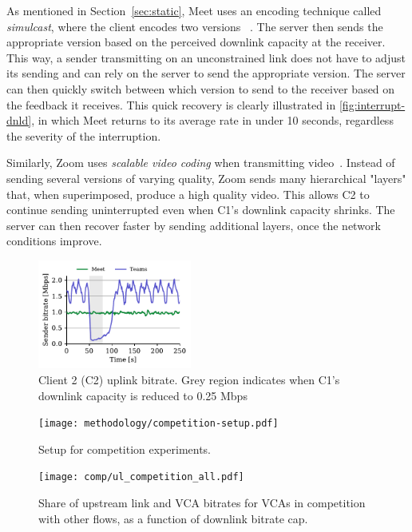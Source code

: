 As mentioned in Section~\ref{sec:static}, Meet uses an encoding technique called \textit{simulcast}, where the client encodes two versions ~\cite{nistico2020comparative}. The server then sends the appropriate version based on the perceived downlink capacity at the receiver. This way, a sender transmitting on an unconstrained link does not have to adjust its sending and can rely on the server to send the appropriate version. The server can then quickly switch between which version to send to the receiver based on the feedback it receives. This quick recovery is clearly illustrated in \ref{fig:interrupt-dnld}, in which Meet returns to its average rate in under 10 seconds, regardless the severity of the interruption.

Similarly, Zoom uses \textit{scalable video coding} when transmitting video~\cite{zoom_encoding}. Instead of sending several versions of varying quality, Zoom sends many hierarchical "layers" that, when superimposed, produce a high quality video. This allows C2 to continue sending uninterrupted even when C1's downlink capacity shrinks. The server can then recover faster by sending additional layers, once the network conditions improve.  


\begin{figure}[t]
    \centering
    \includegraphics[width=0.45\textwidth,keepaspectratio]{../figures/interrupt/Interrupt-sender.pdf}
    \caption{Client 2 (C2) uplink bitrate. Grey region indicates when C1's downlink capacity is reduced to 0.25 Mbps}
    \label{fig:interrupt-sender}
\end{figure}

\begin{figure}[]
   \centering
    \texttt{[image: methodology/competition-setup.pdf]}
    \caption{Setup for competition experiments.}
    \label{fig:competition-setup}
\end{figure}

 \begin{figure}[t]
    \texttt{[image: comp/ul\_competition\_all.pdf]}
    \caption{Share of upstream link and VCA bitrates for VCAs in competition with other flows, as a function of downlink bitrate cap.}
	\label{fig:comp_bitrates_ul}
\end{figure}


